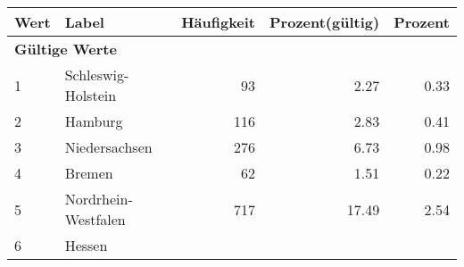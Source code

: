      \begin{longtable}{lXrrr}
     \toprule
     \textbf{Wert} & \textbf{Label} & \textbf{Häufigkeit} & \textbf{Prozent(gültig)} & \textbf{Prozent} \\
     \endhead
     \midrule
     \multicolumn{5}{l}{\textbf{Gültige Werte}}\\

     1 &
     \multicolumn{1}{X}{ Schleswig-Holstein   } &


       \num{93} &
       \num[round-mode=places,round-precision=2]{2,27} &
         \num[round-mode=places,round-precision=2]{0,33} \\

     2 &
     \multicolumn{1}{X}{ Hamburg   } &


       \num{116} &
       \num[round-mode=places,round-precision=2]{2,83} &
         \num[round-mode=places,round-precision=2]{0,41} \\

     3 &
     \multicolumn{1}{X}{ Niedersachsen   } &


       \num{276} &
       \num[round-mode=places,round-precision=2]{6,73} &
         \num[round-mode=places,round-precision=2]{0,98} \\

     4 &
     \multicolumn{1}{X}{ Bremen   } &


       \num{62} &
       \num[round-mode=places,round-precision=2]{1,51} &
         \num[round-mode=places,round-precision=2]{0,22} \\

     5 &
     \multicolumn{1}{X}{ Nordrhein-Westfalen   } &


       \num{717} &
       \num[round-mode=places,round-precision=2]{17,49} &
         \num[round-mode=places,round-precision=2]{2,54} \\

     6 &
     \multicolumn{1}{X}{ Hessen   } &



\end{longtable}
